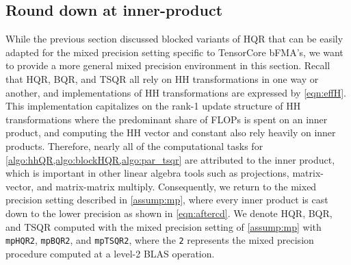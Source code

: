 \subsection{Round down at inner-product}\label{sec:mp-2}
While the previous section discussed blocked variants of HQR that can be easily adapted for the mixed precision setting specific to TensorCore bFMA's, we want to provide a more general mixed precision environment in this section.
Recall that HQR, BQR, and TSQR all rely on HH transformations in one way or another, and implementations of HH transformations are expressed by \cref{eqn:effH}.
This implementation capitalizes on the rank-1 update structure of HH transformations where the predominant share of FLOPs is spent on an inner product, and computing the HH vector and constant also rely heavily on inner products.
Therefore, nearly all of the computational tasks for \cref{algo:hhQR,algo:blockHQR,algo:par_tsqr} are attributed to the inner product, which is important in other linear algebra tools such as projections, matrix-vector, and matrix-matrix multiply.
Consequently, we return to the mixed precision setting described in \cref{assump:mp}, where every inner product is cast down to the lower precision as shown in \cref{eqn:aftercd}. 
We denote HQR, BQR, and TSQR computed with the mixed precision setting of \cref{assump:mp} with {\tt mpHQR2}, {\tt mpBQR2}, and {\tt mpTSQR2}, where the {\tt 2} represents the mixed precision procedure computed at a level-2 BLAS operation.

